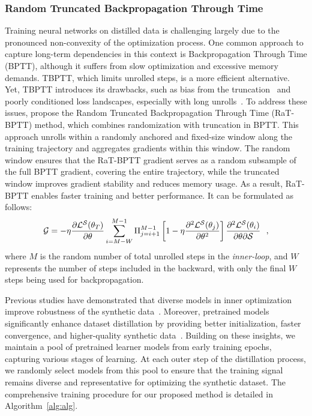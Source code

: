 \vspace{0.1cm}
\subsubsection{Random Truncated Backpropagation Through Time}



Training neural networks on distilled data is challenging largely due to the pronounced non-convexity of the optimization process. One common approach to capture long-term dependencies in this context is Backpropagation Through Time (BPTT), although it suffers from slow optimization and excessive memory demands. TBPTT, which limits unrolled steps, is a more efficient alternative. Yet, TBPTT introduces its drawbacks, such as bias from the truncation~\cite{wu2018understanding} and poorly conditioned loss landscapes, especially with long unrolls~\cite{vicol2021unbiased}. To address these issues, \cite{feng2023embarrassingly} propose the Random Truncated Backpropagation Through Time (RaT-BPTT) method, which combines randomization with truncation in BPTT. This approach unrolls within a randomly anchored and fixed-size window along the training trajectory and aggregates gradients within this window. The random window ensures that the RaT-BPTT gradient serves as a random subsample of the full BPTT gradient, covering the entire trajectory, while the truncated window improves gradient stability and reduces memory usage. As a result, RaT-BPTT enables faster training and better performance. It can be formulated as follows:
\begin{equation}
    \mathcal{G} = - \eta \frac{\partial\mathcal{L}^{\mathcal{S}}(\theta_{T})}{\partial\theta} \sum_{i=M-W}^{M-1} \Pi_{j=i+1}^{M-1} \left[1 - \eta \frac{\partial^{2}\mathcal{L}^{\mathcal{S}}(\theta_{j})}{\partial\theta^{2}}\right] \frac{\partial^{2}\mathcal{L}^{\mathcal{S}}(\theta_{i})}{\partial\theta \partial\mathcal{S}} ~~,
\end{equation}
where $M$ is the random number of total unrolled steps in the \emph{inner-loop}, and $W$ represents the number of steps included in the backward, with only the final $W$ steps being used for backpropagation.

Previous studies have demonstrated that diverse models in inner optimization improve robustness of the synthetic data~\cite{zhao2023dataset, cazenavette2022dataset}. Moreover, pretrained models significantly enhance dataset distillation by providing better initialization, faster convergence, and higher-quality synthetic data~\cite{lu2023can, sachdeva2023farzi}. Building on these insights, we maintain a pool of pretrained learner models from early training epochs, capturing various stages of learning. At each outer step of the distillation process, we randomly select models from this pool to ensure that the training signal remains diverse and representative for optimizing the synthetic dataset. The comprehensive training procedure for our proposed method is detailed in Algorithm~\ref{alg:alg}. 
